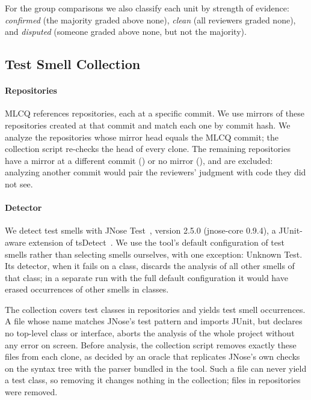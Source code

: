 For the group comparisons we also classify each unit by strength of evidence:
\emph{confirmed} (the majority graded above none), \emph{clean} (all reviewers graded
none), and \emph{disputed} (someone graded above none, but not the majority).

\subsection{Test Smell Collection}
\label{sec:collection}

\paragraph{Repositories}
MLCQ references \FreposMlcq{} repositories, each at a specific commit. We use mirrors of
these repositories created at that commit and match each one by commit hash. We analyze
the \FreposHashOk{} repositories whose mirror head equals the MLCQ commit; the collection
script re-checks the head of every clone. The remaining repositories have a mirror at a
different commit (\FreposHashDiverge{}) or no mirror (\FreposSemEspelho{}), and are
excluded: analyzing another commit would pair the reviewers' judgment with code they did
not see.

\paragraph{Detector}
We detect test smells with JNose Test~\cite{virginio2020jnose}, version 2.5.0
(jnose-core 0.9.4), a JUnit-aware extension of tsDetect~\cite{peruma2020tsdetect}. We use
the tool's default configuration of \FsmellsHabilitados{} test smells rather than
selecting smells ourselves, with one exception: Unknown Test. Its detector, when it fails
on a class, discards the analysis of all other smells of that class; in a separate run
with the full default configuration it would have erased \FunknownOcorrencias{}
occurrences of other smells in \FunknownClasses{} classes.

The collection covers \FclassesTeste{} test classes in \FreposComTeste{} repositories and
yields \Focorrencias{} test smell occurrences. A file whose name matches JNose's test
pattern and imports JUnit, but declares no top-level class or interface, aborts the
analysis of the whole project without any error on screen. Before analysis, the
collection script removes exactly these files from each clone, as decided by an oracle
that replicates JNose's own checks on the syntax tree with the parser bundled in the tool.
Such a file can never yield a test class, so removing it changes nothing in the
collection; \FarquivosRemovidosNpe{} files in \FreposRemovidosNpe{} repositories were
removed.

